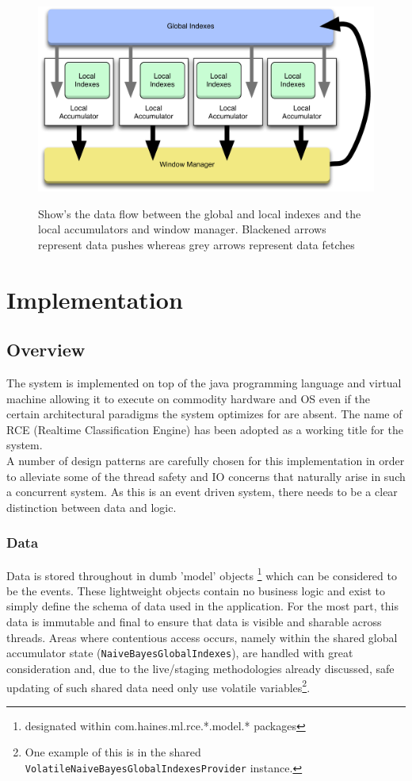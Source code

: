 \documentclass[a4paper,11pt]{scrreprt}
\begin{document}
\begin{figure}[h!]
\centering
\caption{Show's the data flow between the global and local indexes and the local accumulators and window manager. Blackened arrows represent data pushes whereas grey arrows represent data fetches}
\includegraphics[scale=0.35, trim=0 0 0 12, clip=true] {indexes.pdf}
\label{fig:indexes}
\end{figure}

\chapter{Implementation}
\VerbatimFootnotes
\section{Overview}
The system is implemented on top of the java programming language and virtual machine allowing it to execute on commodity hardware and OS even if the certain architectural paradigms the system optimizes for are absent. The name of RCE (Realtime Classification Engine) has been adopted as a working title for the system. \\A number of design patterns are carefully chosen for this implementation in order to alleviate some of the thread safety and IO concerns that naturally arise in such a concurrent system. As this is an event driven system, there needs to be a clear distinction between data and logic. 
\subsection{Data}
Data is stored throughout in dumb 'model' objects \footnote{designated within com.haines.ml.rce.*.model.* packages} which can be considered to be the events. These lightweight objects contain no business logic and exist to simply define the schema of data used in the application. For the most part, this data is immutable and final to ensure that data is visible and sharable across threads. Areas where contentious access occurs, namely within the shared global accumulator state (\verb|NaiveBayesGlobalIndexes|), are handled with great consideration and, due to the live/staging methodologies already discussed, safe updating of such shared data need only use volatile variables\footnote{One example of this is in the shared \verb|VolatileNaiveBayesGlobalIndexesProvider| instance.}. 
\end{document}
